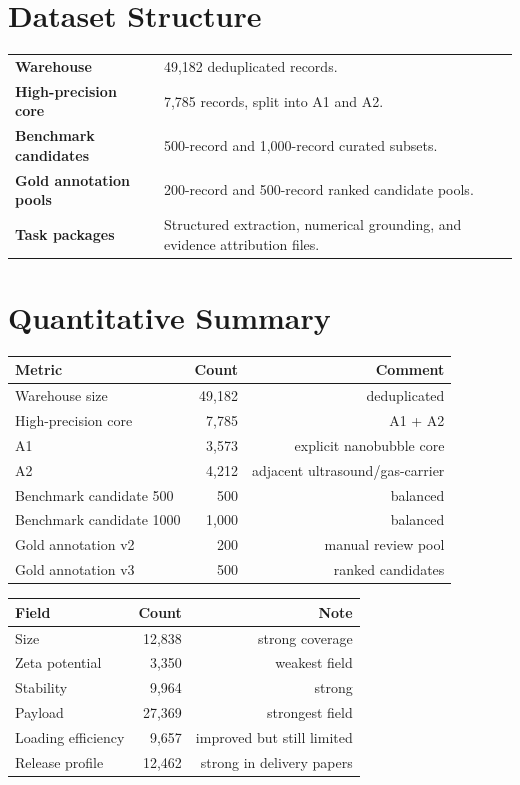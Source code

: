 \documentclass[11pt]{article}
\begin{document}
\section*{Dataset Structure}
\begin{tabularx}{\textwidth}{>{\bfseries}p{3.5cm}X}
\toprule
Warehouse & 49,182 deduplicated records. \\
High-precision core & 7,785 records, split into A1 and A2. \\
Benchmark candidates & 500-record and 1,000-record curated subsets. \\
Gold annotation pools & 200-record and 500-record ranked candidate pools. \\
Task packages & Structured extraction, numerical grounding, and evidence attribution files. \\
\bottomrule
\end{tabularx}

\section*{Quantitative Summary}
\begin{table}[h]
\centering
\begin{tabular}{lrr}
\toprule
Metric & Count & Comment \\
\midrule
Warehouse size & 49,182 & deduplicated \\
High-precision core & 7,785 & A1 + A2 \\
A1 & 3,573 & explicit nanobubble core \\
A2 & 4,212 & adjacent ultrasound/gas-carrier \\
Benchmark candidate 500 & 500 & balanced \\
Benchmark candidate 1000 & 1,000 & balanced \\
Gold annotation v2 & 200 & manual review pool \\
Gold annotation v3 & 500 & ranked candidates \\
\bottomrule
\end{tabular}
\end{table}

\begin{table}[h]
\centering
\begin{tabular}{lrr}
\toprule
Field & Count & Note \\
\midrule
Size & 12,838 & strong coverage \\
Zeta potential & 3,350 & weakest field \\
Stability & 9,964 & strong \\
Payload & 27,369 & strongest field \\
Loading efficiency & 9,657 & improved but still limited \\
Release profile & 12,462 & strong in delivery papers \\
\bottomrule
\end{tabular}
\end{table}
\end{document}
